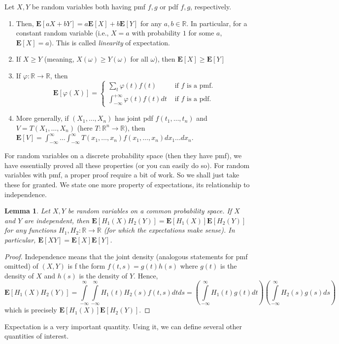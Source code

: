 \documentclass[preprint,  11pt]{amsart}
\def\intt{\int\limits}
\newcommand{\para}[1]{\vspace{4mm}\noindent{\bfseries #1:}}
\theoremstyle{plain} %
\newtheorem{lemma}[theorem]{Lemma}
\theoremstyle{definition} %
\begin{document}
\para{Properties of expectation} Let $X,Y$ be random variables both having pmf $f,g$ or  pdf $f,g$, respectively. 
\begin{enumerate}\setlength\itemsep{6pt}
\item Then, $\mathbf{E}[aX+bY]=a\mathbf{E}[X]+b\mathbf{E}[Y]$ for any $a,b\in \mathbb{R}$. In particular, for a constant random variable (i.e., $X=a$ with probability $1$ for some $a$, $\mathbf{E}[X]=a$). This is called {\em linearity} of expectation.
\item If $X\ge Y$ (meaning, $X(\omega)\ge Y(\omega)$ for all $\omega$), then $\mathbf{E}[X]\ge \mathbf{E}[Y]$
\item If $\varphi:\mathbb{R}\rightarrow \mathbb{R}$, then $$\mathbf{E}[\varphi(X)]= \begin{cases}
\sum\limits_{t}\varphi(t)f(t) & \mbox{ if $f$ is a pmf}. \\
\int_{-\infty}^{+\infty}\varphi(t)f(t) dt & \mbox{ if $f$ is a pdf}.
\end{cases}
$$
\item More generally, if $(X_{1},\ldots ,X_{n})$ has joint pdf $f(t_{1},\ldots ,t_{n})$ and $V=T(X_{1},\ldots ,X_{n})$ (here $T:\mathbb{R}^{n}\rightarrow \mathbb{R}$), then $\mathbf{E}[V]=\int_{-\infty}^{\infty}\ldots \int_{-\infty}^{\infty}T(x_{1},\ldots ,x_{n})f(x_{1},\ldots ,x_{n})dx_{1}\ldots dx_{n}$. 
\end{enumerate}
For random variables on a discrete probability space (then they have  pmf), we have essentially proved all these properties (or you can easily do so). For random variables with pmf, a proper proof require a bit of work. So we shall just take these for granted.
%
We state one more property of expectations, its relationship to independence.
\begin{lemma} Let $X,Y$ be random variables on a common probability space. If $X$ and $Y$ are independent, then $\mathbf{E}[H_{1}(X)H_{2}(Y)]=\mathbf{E}[H_{1}(X)]\mathbf{E}[H_{2}(Y)]$ for any functions $H_{1},H_{2}:\mathbb{R}\rightarrow \mathbb{R}$ (for which the expectations make sense). In particular, $\mathbf{E}[XY]=\mathbf{E}[X]\mathbf{E}[Y]$. 
\end{lemma}
\begin{proof} Independence means that the joint density (analogous statements for pmf omitted) of $(X,Y)$ is f the form $f(t,s)=g(t)h(s)$ where $g(t)$ is the density of $X$ and $h(s)$ is the density of $Y$. Hence, 
$$
\mathbf{E}[H_{1}(X)H_{2}(Y)]=\intt_{-\infty}^{\infty}\!\!\intt_{-\infty}^{\infty} H_{1}(t)H_{2}(s) f(t,s)dt ds = \left(\int\limits_{-\infty}^{\infty} H_{1}(t)g(t) dt \right)\left(\int\limits_{-\infty}^{\infty} H_{2}(s)g(s) ds \right)
$$
which is precisely $\mathbf{E}[H_{1}(X)]\mathbf{E}[H_{2}(Y)]$.
\end{proof}
Expectation is a very important quantity. Using it, we can define several other quantities of interest.
\end{document}
